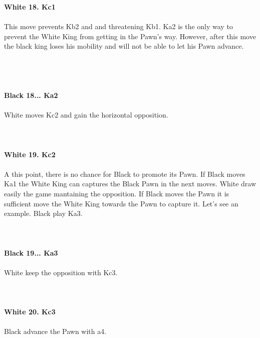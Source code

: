 \documentclass{article}
\begin{document}
\\

\\
\\
\textbf{White 18. Kc1}\\
\\
This move prevents Kb2 and and threatening Kb1. Ka2 is the only way to prevent the White King from getting in the Pawn's way. However, after this move the black king loses his mobility and will not be able to let his Pawn advance.\\\\
\\

\\
\\
\textbf{Black 18... Ka2}\\
\\
White moves Kc2 and gain the horizontal opposition.\\
\\

\\
\\
\textbf{White 19. Kc2}\\
\\
A this point, there is no chance for Black to promote its Pawn. If Black moves Ka1 the White King can captures the Black Pawn in the next moves. White draw easily the game mantaining the opposition. If Black moves the Pawn it is sufficient move the White King towards the Pawn to capture it. Let's see an example. Black play Ka3.\\
\\

\\
\\
\textbf{Black 19... Ka3}\\
\\
White keep the opposition with Kc3.\\
\\

\\
\\
\textbf{White 20. Kc3}\\
\\
Black advance the Pawn with a4.\\
\\

\end{document}
